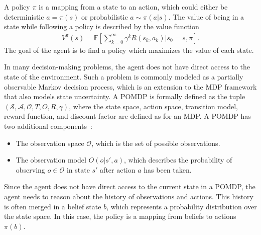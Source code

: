 A policy $\pi$ is a mapping from a state to an action, which could either be deterministic $a=\pi(s)$ or probabilistic $a \sim \pi(a|s)$. The value of being in a state while following a policy is described by the value function
%
\begin{align}
    V^\pi(s) = \mathbb{E} \left[ \sum_{k=0}^\infty \gamma^k R(s_k, a_k) | s_0 = s, \pi \right].
\end{align}
%
The goal of the agent is to find a policy which maximizes the value of each state.



In many decision-making problems, the agent does not have direct access to the state of the environment. Such a problem is commonly modeled as a partially observable Markov decision process, which is an extension to the MDP framework that also models state uncertainty. A POMDP is formally defined as the tuple  $( \mathcal{S}, \mathcal{A}, \mathcal{O}, T, O, R, \gamma )$, where the state space, action space, transition model, reward function, and discount factor are defined as for an MDP. A POMDP has two additional components~\cite[Ch. 6]{Kochenderfer2015}:
%
\begin{itemize}
    \item The observation space $\mathcal{O}$, which is the set of possible observations.
    \item The observation model $O(o|s',a)$, which describes the probability of observing $o \in \mathcal{O}$ in state $s'$ after action $a$ has been taken.
\end{itemize}
%
Since the agent does not have direct access to the current state in a POMDP, the agent needs to reason about the history of observations and actions. This history is often merged in a belief state $b$, which represents a probability distribution over the state space. In this case, the policy is a mapping from beliefs to actions $\pi(b)$.



